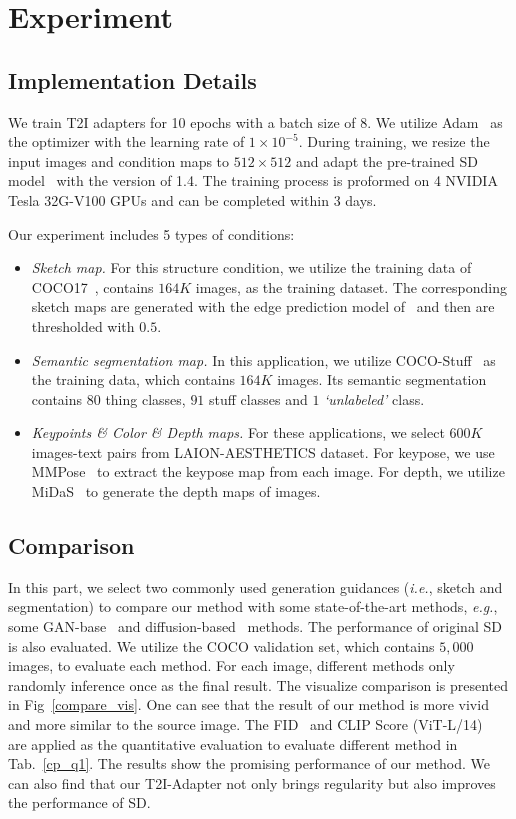 \section{Experiment}
\subsection{Implementation Details} We train T2I adapters for 10 epochs with a batch size of 8. We utilize Adam~\cite{adam} as the optimizer with the learning rate of $1\times 10^{-5}$. During training, we resize the input images and condition maps to $512\times 512$ and adapt the pre-trained SD model~\cite{ldm} with the version of 1.4. The training process is proformed on 4 NVIDIA Tesla 32G-V100 GPUs and can be completed within 3 days. 

Our experiment includes 5 types of conditions:

\begin{itemize}
    \item \textit{Sketch map.} For this structure condition, we utilize the training data of COCO17~\cite{coco}, contains $164K$ images, as the training dataset. The corresponding sketch maps are generated with the edge prediction model of~\cite{edge} and then are thresholded with $0.5$.
    \item \textit{Semantic segmentation map.} In this application, we utilize COCO-Stuff~\cite{coco_st} as the training data, which contains $164K$ images. Its semantic segmentation contains $80$ thing classes, $91$ stuff classes and $1$ \textit{`unlabeled'} class.
    \item \textit{Keypoints \& Color \& Depth maps.} For these applications, we select $600K$ images-text pairs from LAION-AESTHETICS dataset. For keypose, we use MMPose~\cite{mmpose} to extract the keypose map from each image. For depth, we utilize MiDaS~\cite{midas} to generate the depth maps of images.
\end{itemize}

\subsection{Comparison}
In this part, we select two commonly used generation guidances (\textit{i.e.}, sketch and segmentation) to compare our method with some state-of-the-art methods, \textit{e.g.}, some GAN-base~\cite{spade,oasis} and diffusion-based~\cite{piti} methods. The performance of original SD~\cite{ldm} is also evaluated. We utilize the COCO validation set, which contains $5,000$ images, to evaluate each method. For each image, different methods only randomly inference once as the final result. The visualize comparison is presented in Fig~\ref{compare_vis}. One can see that the result of our method is more vivid and more similar to the source image. The FID~\cite{fid} and CLIP Score (ViT-L/14)~\cite{clips} are applied as the quantitative evaluation to evaluate different method in Tab.~\ref{cp_q1}. The results show the promising performance of our method. We can also find that our T2I-Adapter not only brings regularity but also improves the performance of SD.

